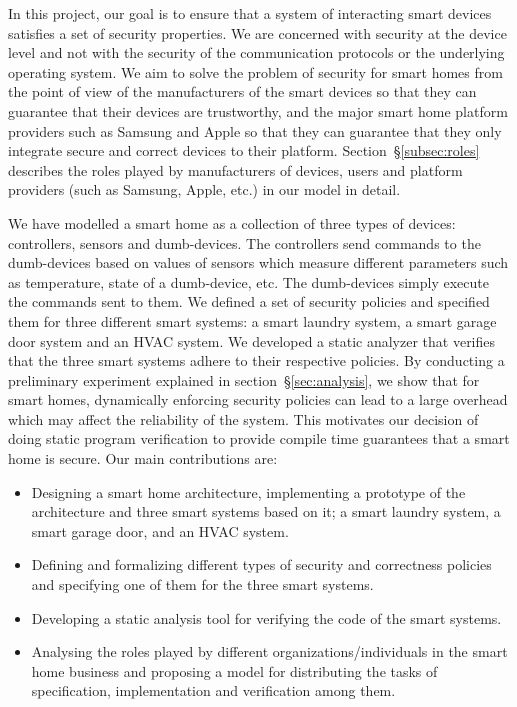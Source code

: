 \documentclass{article}
\begin{document}
In this project, our goal is to ensure that a system of interacting smart devices satisfies a set of security properties. We are concerned with security at the device level and not with the security of the communication protocols or the underlying operating system. We aim to solve the problem of security for smart homes from the point of view of the manufacturers of the smart devices so that they can guarantee that their devices are trustworthy, and the major smart home platform providers such as Samsung and Apple so that they can guarantee that they only integrate secure and correct devices to their platform. Section~\S\ref{subsec:roles} describes the roles played by manufacturers of devices, users and platform providers (such as Samsung, Apple, etc.) in our model in detail.

We have modelled a smart home as a collection of three types of devices: controllers, sensors and dumb-devices. The controllers send commands to the dumb-devices based on values of sensors which measure different parameters such as temperature, state of a dumb-device, etc. The dumb-devices simply execute the commands sent to them.
We defined a set of security policies and specified them for three different smart systems: a smart laundry system, a smart garage door system and an HVAC system. We developed a static analyzer that verifies that the three smart systems adhere to their respective policies. By conducting a preliminary experiment explained in section~\S\ref{sec:analysis}, we show that for smart homes, dynamically enforcing security policies can lead to a large overhead which may affect the reliability of the system. This motivates our decision of doing static program verification to provide compile time guarantees that a smart home is secure. Our main contributions are:
\begin{itemize}[topsep=0pt,itemsep=0ex,partopsep=1ex,parsep=1ex]
    \item Designing a smart home architecture, implementing a prototype of the architecture and three smart systems based on it; a smart laundry system, a smart garage door, and an HVAC system.    
    \item Defining and formalizing different types of security and correctness policies and specifying one of them for the three smart systems.
    \item Developing a static analysis tool for verifying the code of the smart systems.
    \item Analysing the roles played by different organizations/individuals in the smart home business and proposing a model for distributing the tasks of specification, implementation and verification among them.
\end{itemize}
  
\end{document}
